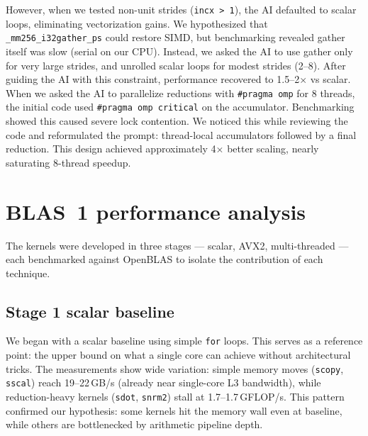 \documentclass[11pt,a4paper]{article}
\begin{document}
However, when we tested non-unit strides (\texttt{incx > 1}), the AI defaulted to scalar loops, eliminating vectorization gains. We hypothesized that \texttt{\_mm256\_i32gather\_ps} could restore SIMD, but benchmarking revealed gather itself was slow (serial on our CPU). Instead, we asked the AI to use gather only for very large strides, and unrolled scalar loops for modest strides (2--8). After guiding the AI with this constraint, performance recovered to 1.5--2$\times$ vs scalar.\\

When we asked the AI to parallelize reductions with \texttt{\#pragma omp} for 8 threads, the initial code used \texttt{\#pragma omp critical} on the accumulator. Benchmarking showed this caused severe lock contention. We noticed this while reviewing the code and reformulated the prompt: thread-local accumulators followed by a final reduction. This design achieved approximately 4$\times$ better scaling, nearly saturating 8-thread speedup.

\section{BLAS~1 performance analysis}

The kernels were developed in three stages — scalar, AVX2, multi-threaded — each benchmarked against OpenBLAS to isolate the contribution of each technique.

\subsection*{Stage 1 scalar baseline}
We began with a scalar baseline using simple \texttt{for} loops. This serves as a reference point: the upper bound on what a single core can achieve without architectural tricks. The measurements show wide variation: simple memory moves (\texttt{scopy}, \texttt{sscal}) reach 19--22\,GB/s (already near single-core L3 bandwidth), while reduction-heavy kernels (\texttt{sdot}, \texttt{snrm2}) stall at 1.7--1.7\,GFLOP/s. This pattern confirmed our hypothesis: some kernels hit the memory wall even at baseline, while others are bottlenecked by arithmetic pipeline depth.
\end{document}
